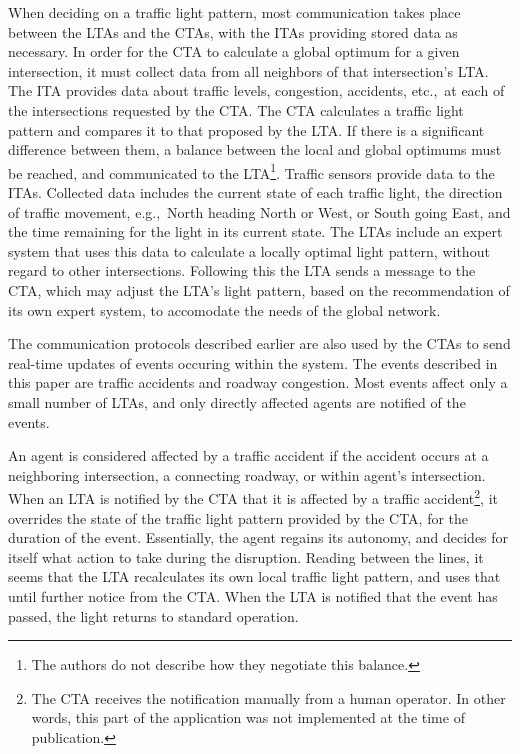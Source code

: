\documentclass[11pt,letterpaper,onecolumn,twoside,openright,final]{report}
\begin{document}

When deciding on a traffic light pattern, most communication takes place between the LTAs and the CTAs, with the ITAs providing stored data as necessary.
In order for the CTA to calculate a global optimum for a given intersection, it must collect data from all neighbors of that intersection's LTA.
The ITA provides data about traffic levels, congestion, accidents, etc.,~at each of the intersections requested by the CTA.
The CTA calculates a traffic light pattern and compares it to that proposed by the LTA.
If there is a significant difference between them, a balance between the local and global optimums must be reached, and communicated to the LTA\footnote{The authors do not describe how they negotiate this balance.}.
Traffic sensors provide data to the ITAs.
Collected data includes the current state of each traffic light, the direction of traffic movement, e.g.,~North heading North or West, or South going East, and the time remaining for the light in its current state.
The LTAs include an expert system that uses this data to calculate a locally optimal light pattern, without regard to other intersections.
Following this the LTA sends a message to the CTA, which may adjust the LTA's light pattern, based on the recommendation of its own expert system, to accomodate the needs of the global network.

The communication protocols described earlier are also used by the CTAs to send real-time updates of events occuring within the system.
The events described in this paper are traffic accidents and roadway congestion.
Most events affect only a small number of LTAs, and only directly affected agents are notified of the events.

An agent is considered affected by a traffic accident if the accident occurs at a neighboring intersection, a connecting roadway, or within agent's intersection.
When an LTA is notified by the CTA that it is affected by a traffic accident\footnote{The CTA receives the notification manually from a human operator. In other words, this part of the application was not implemented at the time of publication.}, it overrides the state of the traffic light pattern provided by the CTA, for the duration of the event.
Essentially, the agent regains its autonomy, and decides for itself what action to take during the disruption.
Reading between the lines, it seems that the LTA recalculates its own local traffic light pattern, and uses that until further notice from the CTA.
When the LTA is notified that the event has passed, the light returns to standard operation.
\end{document}
